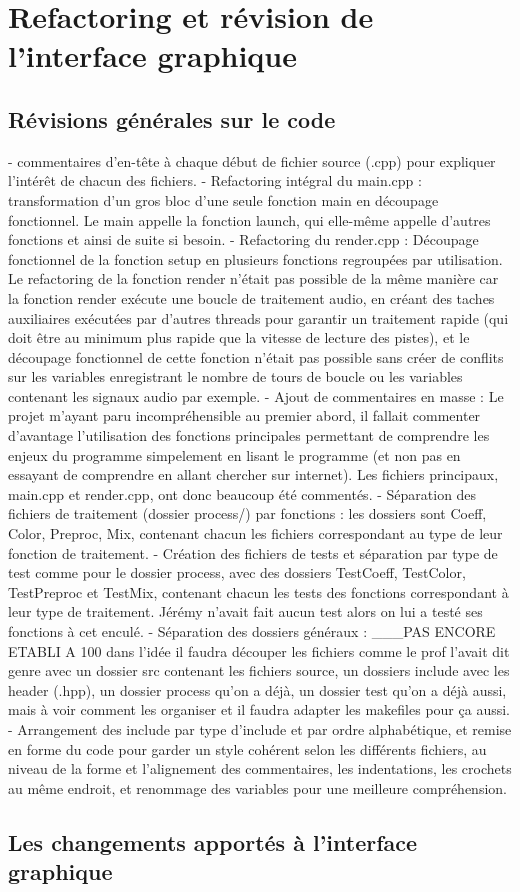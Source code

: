 \section{Refactoring et révision de l'interface graphique}

\subsection{Révisions générales sur le code}
  - commentaires d'en-tête à chaque début de fichier source (.cpp) pour
  expliquer l'intérêt de chacun des fichiers.
  - Refactoring intégral du main.cpp : transformation d'un gros bloc d'une seule
  fonction main en découpage fonctionnel. Le main appelle la fonction launch,
  qui elle-même appelle d'autres fonctions et ainsi de suite si besoin.
  - Refactoring du render.cpp : Découpage fonctionnel de la fonction setup
  en plusieurs fonctions regroupées par utilisation. Le refactoring de la
  fonction render n'était pas possible de la même manière car la fonction render
  exécute une boucle de traitement audio, en créant des taches auxiliaires
  exécutées par d'autres threads pour garantir un traitement rapide (qui doit
  être au minimum plus rapide que la vitesse de lecture des pistes), et le
  découpage fonctionnel de cette fonction n'était pas possible sans créer de
  conflits sur les variables enregistrant le nombre de tours de boucle ou les
  variables contenant les signaux audio par exemple.
  - Ajout de commentaires en masse : Le projet m'ayant paru incompréhensible au
  premier abord, il fallait commenter d'avantage l'utilisation des fonctions
  principales permettant de comprendre les enjeux du programme simpelement en
  lisant le programme (et non pas en essayant de comprendre en allant chercher
  sur internet). Les fichiers principaux, main.cpp et render.cpp, ont donc
  beaucoup été commentés.
  - Séparation des fichiers de traitement (dossier process/) par fonctions :
  les dossiers sont Coeff, Color, Preproc, Mix, contenant chacun les fichiers
  correspondant au type de leur fonction de traitement.
  - Création des fichiers de tests et séparation par type de test comme pour
  le dossier process, avec des dossiers TestCoeff, TestColor, TestPreproc et
  TestMix, contenant chacun les tests des fonctions correspondant à leur type de
  traitement. Jérémy n'avait fait aucun test alors on lui a testé ses fonctions
  à cet enculé.
  - Séparation des dossiers généraux : ___PAS ENCORE ETABLI A 100%
  dans l'idée il faudra découper les fichiers comme le prof l'avait dit genre
  avec un dossier src contenant les fichiers source, un dossiers include avec
  les header (.hpp), un dossier process qu'on a déjà, un dossier test qu'on a
  déjà aussi, mais à voir comment les organiser et il faudra adapter les
  makefiles pour ça aussi.
  - Arrangement des include par type d'include et par ordre alphabétique, et
  remise en forme du code pour garder un style cohérent selon les différents
  fichiers, au niveau de la forme et l'alignement des commentaires,
  les indentations, les crochets au même endroit, et renommage des variables
  pour une meilleure compréhension.

\subsection{Les changements apportés à l'interface graphique}
